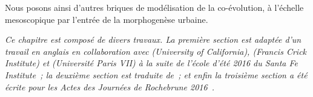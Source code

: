 Nous posons ainsi d'autres briques de modélisation de la co-évolution, à l'échelle mesoscopique par l'entrée de la morphogenèse urbaine.




\stars


\textit{Ce chapitre est composé de divers travaux. La première section est adaptée d'un travail en anglais en collaboration avec  (University of California),  (Francis Crick Institute) et  (Université Paris VII) à la suite de l'école d'été 2016 du Santa Fe Institute~\cite{antelope2016interdisciplinary}; la deuxième section est traduite de~\cite{raimbault2017calibration}; et enfin la troisième section a été écrite pour les Actes des Journées de Rochebrune 2016~\cite{raimbault2016generation}.}

















